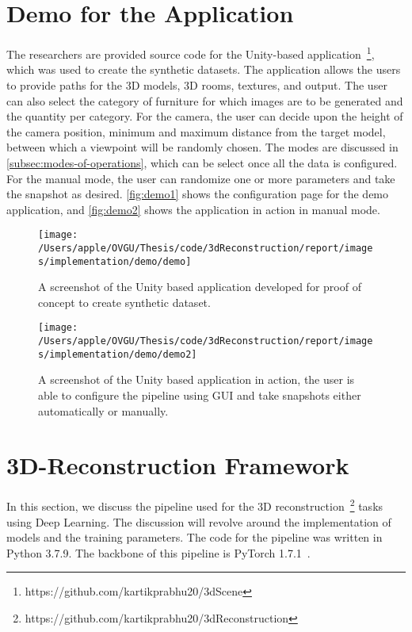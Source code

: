 \section{Demo for the Application}\label{sec:demo}

The researchers are provided source code for the Unity-based application~\footnote{https://github.com/kartikprabhu20/3dScene}, which was used to create the synthetic datasets.
The application allows the users to provide paths for the 3D models, 3D rooms, textures, and output.
The user can also select the category of furniture for which images are to be generated and the quantity per category.
For the camera, the user can decide upon the height of the camera position, minimum and maximum distance from the target model, between which a viewpoint will be randomly chosen.
The modes are discussed in \autoref{subsec:modes-of-operations}, which can be select once all the data is configured.
For the manual mode, the user can randomize one or more parameters and take the snapshot as desired.
\autoref{fig:demo1} shows the configuration page for the demo application, and \autoref{fig:demo2} shows the application in action in manual mode.

\begin{figure}
    \centering
    \texttt{[image: /Users/apple/OVGU/Thesis/code/3dReconstruction/report/images/implementation/demo/demo]}
    \caption[User Interface for 3D-Scene Tool.]{A screenshot of the Unity based application developed for proof of concept to create synthetic dataset.}
    \label{fig:demo1}
\end{figure}

\begin{figure}
    \centering
    \texttt{[image: /Users/apple/OVGU/Thesis/code/3dReconstruction/report/images/implementation/demo/demo2]}
    \caption[Demo for 3D-Scene Tool.]{A screenshot of the Unity based application in action, the user is able to configure the pipeline using GUI and take snapshots either automatically or manually.}
    \label{fig:demo2}
\end{figure}

\section{3D-Reconstruction Framework}\label{sec:3d-reconstruction-framework}

In this section, we discuss the pipeline used for the 3D reconstruction~\footnote{https://github.com/kartikprabhu20/3dReconstruction} tasks using Deep Learning.
The discussion will revolve around the implementation of models and the training parameters.
The code for the pipeline was written in Python 3.7.9.
The backbone of this pipeline is PyTorch 1.7.1~\cite{NEURIPS2019_9015}.

